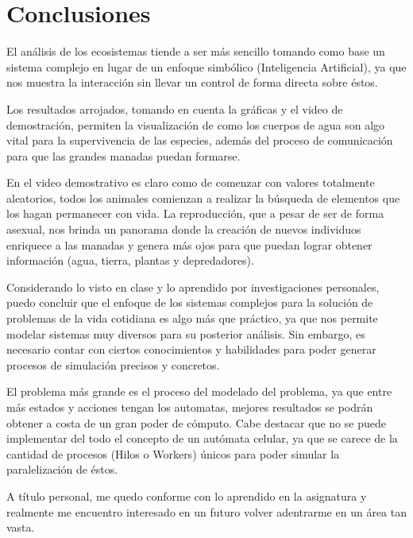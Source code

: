 \chapter{Conclusiones}
  El análisis de los ecosistemas tiende a ser más sencillo tomando como base un sistema complejo en lugar de un enfoque simbólico (Inteligencia Artificial), ya que nos muestra la interacción sin llevar un control de forma directa sobre éstos.

  Los resultados arrojados, tomando en cuenta la gráficas y el video de demostración, permiten la visualización de como los cuerpos de agua son algo vital para la supervivencia de las especies, además del proceso de comunicación para que las grandes manadas puedan formarse.

  En el video demostrativo es claro como de comenzar con valores totalmente aleatorios, todos los animales comienzan a realizar la búsqueda de elementos que los hagan permanecer con vida. La reproducción, que a pesar de ser de forma asexual, nos brinda un panorama donde la creación de nuevos individuos enriquece a las manadas y genera más ojos para que puedan lograr obtener información (agua, tierra, plantas y depredadores).

  Considerando lo visto en clase y lo aprendido por investigaciones personales, puedo concluir que el enfoque de los sistemas complejos para la solución de problemas de la vida cotidiana es algo más que práctico, ya que nos permite modelar sistemas muy diversos para su posterior análisis. Sin embargo, es necesario contar con ciertos conocimientos y habilidades para poder generar procesos de simulación precisos y concretos.

  El problema más grande es el proceso del modelado del problema, ya que entre más estados y acciones tengan los automatas, mejores resultados se podrán obtener a costa de un gran poder de cómputo. Cabe destacar que no se puede implementar del todo el concepto de un autómata celular, ya que se carece de la cantidad de procesos (Hilos o Workers) únicos para poder simular la paralelización de éstos.

  A título personal, me quedo conforme con lo aprendido en la asignatura y realmente me encuentro interesado en un futuro volver adentrarme en un área tan vasta.